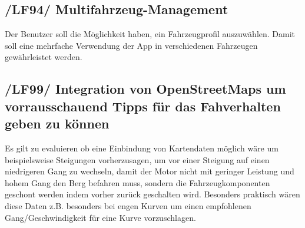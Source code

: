 \subsection{/LF94/ Multifahrzeug-Management}
\newline
Der Benutzer soll die Möglichkeit haben, ein Fahrzeugprofil auszuwählen. Damit soll eine mehrfache Verwendung der App in verschiedenen Fahrzeugen gewährleistet werden.

\subsection{/LF99/ Integration von OpenStreetMaps um vorrausschauend Tipps für das Fahverhalten geben zu können}
\newline
Es gilt zu evaluieren ob eine Einbindung von Kartendaten möglich wäre um beispielsweise Steigungen vorherzusagen, um vor einer Steigung auf einen niedrigeren Gang zu wechseln, damit der Motor nicht mit geringer Leistung und hohem Gang den Berg befahren muss, sondern die Fahrzeugkomponenten geschont werden indem vorher zurück geschalten wird. Besonders praktisch wären diese Daten z.B. besonders bei engen Kurven um einen empfohlenen Gang/Geschwindigkeit für eine Kurve vorzuschlagen.  
